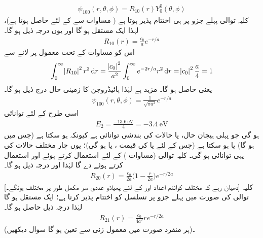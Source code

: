 \begin{align}
\psi_{100}(r,\theta,\phi)=R_{10}(r)Y_{0}^{0}(\theta,\phi) 
\end{align}
 کلیہ توالی پہلے جزو پر ہی اختتام پذیر ہوتا ہے  ( مساوات  سے  کے لئے  
   حاصل ہوتا ہے)،  لہٰذا   ایک مستقل      ہو گا اور  یوں درجہ ذیل ہو گا۔
   \begin{align}
R_{10}(r)=\frac{c_{0}}{a}e^{-r/a} 
\end{align}
   اس کو مساوات  کے تحت معمول پر لانے
سے
\begin{align*}
\int_{0}^{\infty}\abs{R_{10}}^{2}r^{2}\dif{r}=\frac{\abs{c_0}^{2}}{a^{2}}\int_{0}^{\infty}e^{-2r/a}r^{2}\dif{r}=\abs{c_{0}}^{2}\frac{a}{4}=1 
\end{align*}
یعنی  حاصل ہو گا۔ مزید  ہے لہٰذا  ہائیڈروجن کا زمینی حال درج ذیل ہو گا۔
\begin{align}
\psi_{100}(r,\theta,\phi)=\frac{1}{\sqrt{\pi a^{3}}}e^{-r/a} 
\end{align}
اسی طرح  کے لئے توانائی
\begin{align}
E_{2}=\frac{\SI{-13.6}{\electronvolt}}{4}=\SI{-3.4}{\electronvolt}
\end{align}
ہو گی جو پہلی ہیجان حال، یا حالات کی بندشی توانائی ہے کیونکہ    ہو سکتا ہے (جس میں  ہو گا) یا  ہو سکتا ہے (جس  کے لئے یا   کی قیمت ،  یا  ہو گی)؛ یوں چار مختلف حالات کی یہی توانائی ہو گی۔
 کلیہ توالی (مساوات )   کے لئے  استعمال کرتے ہوئے  اور  استعمال کرتے ہوئے  دے گا لہٰذا  اور درجہ ذیل ہو گا۔
 \begin{align}\label{مساوات_تین_ابعادی_رداسی_بیس}
R_{20}(r)=\frac{c_{0}}{2a}\big(1-\frac{r}{2a}\big)e^{-r/2a} 
\end{align}
[دھیان رہے کہ مختلف کوانٹم اعداد  اور  کے لئے پھیلاو عددی سر    مکمل طور پر مختلف ہونگے۔] کلیہ توالی 
     کی صورت میں پہلے جزو پر تسلسل کو اختتام پذیر کرتا ہے؛   ایک مستقل ہو گا  لہٰذا درجہ ذیل حاصل ہو گا۔
   \begin{align}\label{مساوات_تین_ابعادی_رداسی_اکیس}
R_{21}(r)=\frac{c_{0}}{4a^{2}}re^{-r/2a} 
\end{align}
(ہر منفرد صورت میں  معمول زنی سے تعین ہو گا سوال  دیکھیں)۔

